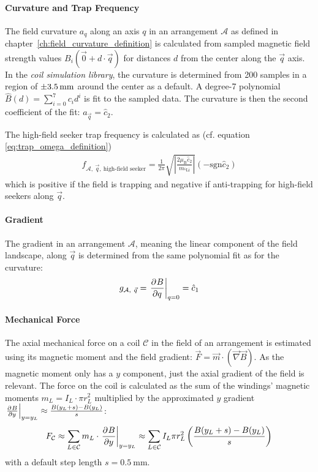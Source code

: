 \paragraph{Curvature and Trap Frequency}
The field curvature $a_q$ along an axis $q$ in an arrangement $\mathcal{A}$ as defined in chapter~\ref{ch:field_curvature_definition} is calculated from sampled magnetic field strength values $B_i(\vec 0 + d \cdot \vec q)$ for distances $d$ from the center along the $\vec q$ axis. In the \textit{coil simulation library}, the curvature is determined from \SI{200}{} samples in a region of $\SI{+-3.5}{\milli\meter}$ around the center as a default. A degree-7 polynomial ${\hat B(d) = \sum_{i=0}^7 c_i d^i}$ is fit to the sampled data. The curvature is then the second coefficient of the fit: $a_{\vec q} = \hat c_2$.

The high-field seeker trap frequency is calculated as (cf. equation \ref{eq:trap_omega_definition})
\begin{align}\label{eq:trap_frequency_simulation}
    f_{\mathcal{A},~\vec q,~\text{high-field seeker}} = \frac{1}{2\pi}  \sqrt{\left| \frac{2 \mu_\text{B} \hat c_2 }{m_{^6\text{Li}}} \right|} (-\mathrm{sgn} \hat c_2)
\end{align}
which is positive if the field is trapping and negative if anti-trapping for high-field seekers along $\vec q$.

\paragraph{Gradient}
The gradient in an arrangement $\mathcal{A}$, meaning the linear component of the field landscape, along $\vec q$ is determined from the same polynomial fit as for the curvature:
\begin{align}\label{eq:gradient_simulation}
    g_{\mathcal{A},~\vec q} = \eval{\pdv[]{B}{q}}_{q = 0} = \hat c_1
\end{align}

\paragraph{Mechanical Force}
The axial mechanical force on a coil $\mathcal{C}$ in the field of an arrangement is estimated using its magnetic moment and the field gradient: $\vec F = \vec m \cdot (\vec \nabla \vec B)$. As the magnetic moment only has a $y$ component, just the axial gradient of the field is relevant. The force on the coil is calculated as the sum of the windings' magnetic moments $m_L = I_L \cdot \pi r_L^2$ multiplied by the approximated $y$ gradient $\eval{\pdv[]{B}{y}}_{y = y_L} \approx \frac{B(y_L + s) - B(y_L)}{s}$:
\begin{align}\label{eq:mechanical_force_simulation}
    F_\mathcal{C} \approx \sum\limits_{L \in \mathcal{C}} m_L \cdot \eval{\pdv[]{B}{y}}_{y = y_L} \approx \sum\limits_{L \in \mathcal{C}} I_L \pi r_L^2 \left(\frac{B(y_L + s)-B(y_L)}{s}\right)
\end{align}
with a default step length $s = \SI{0.5}{\milli\meter}$.

